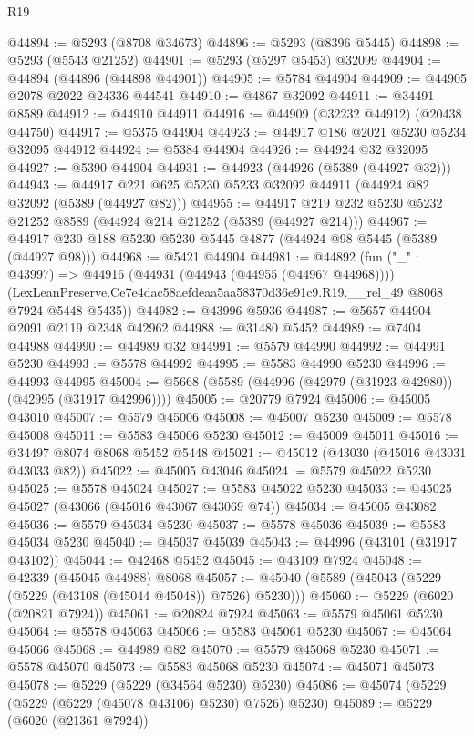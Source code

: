 \begin{lexlean}{R19}
\begin{coremodule}
@44894 := @5293 (@8708 @34673)
@44896 := @5293 (@8396 @5445)
@44898 := @5293 (@5543 @21252)
@44901 := @5293 (@5297 @5453) @32099
@44904 := @44894 (@44896 (@44898 @44901))
@44905 := @5784 @44904
@44909 := @44905 @2078 @2022 @24336 @44541
@44910 := @4867 @32092
@44911 := @34491 @8589
@44912 := @44910 @44911
@44916 := @44909 (@32232 @44912) (@20438 @44750)
@44917 := @5375 @44904
@44923 := @44917 @186 @2021 @5230 @5234 @32095 @44912
@44924 := @5384 @44904
@44926 := @44924 @32 @32095
@44927 := @5390 @44904
@44931 := @44923 (@44926 (@5389 (@44927 @32)))
@44943 := @44917 @221 @625 @5230 @5233 @32092 @44911 (@44924 @82 @32092 (@5389 (@44927 @82)))
@44955 := @44917 @219 @232 @5230 @5232 @21252 @8589 (@44924 @214 @21252 (@5389 (@44927 @214)))
@44967 := @44917 @230 @188 @5230 @5230 @5445 @4877 (@44924 @98 @5445 (@5389 (@44927 @98)))
@44968 := @5421 @44904
@44981 := @44892
    (fun ("_" : @43997) =>
    @44916
      (@44931 (@44943 (@44955 (@44967 @44968))))
      (LexLeanPreserve.Ce7e4dac58aefdeaa5aa58370d36e91c9.R19.__rel_49 @8068 @7924 @5448 @5435))
@44982 := @43996 @5936
@44987 := @5657 @44904 @2091 @2119 @2348 @42962
@44988 := @31480 @5452
@44989 := @7404 @44988
@44990 := @44989 @32
@44991 := @5579 @44990
@44992 := @44991 @5230
@44993 := @5578 @44992
@44995 := @5583 @44990 @5230
@44996 := @44993 @44995
@45004 := @5668 (@5589 (@44996 (@42979 (@31923 @42980)) (@42995 (@31917 @42996))))
@45005 := @20779 @7924
@45006 := @45005 @43010
@45007 := @5579 @45006
@45008 := @45007 @5230
@45009 := @5578 @45008
@45011 := @5583 @45006 @5230
@45012 := @45009 @45011
@45016 := @34497 @8074 @8068 @5452 @5448
@45021 := @45012 (@43030 (@45016 @43031 @43033 @82))
@45022 := @45005 @43046
@45024 := @5579 @45022 @5230
@45025 := @5578 @45024
@45027 := @5583 @45022 @5230
@45033 := @45025 @45027 (@43066 (@45016 @43067 @43069 @74))
@45034 := @45005 @43082
@45036 := @5579 @45034 @5230
@45037 := @5578 @45036
@45039 := @5583 @45034 @5230
@45040 := @45037 @45039
@45043 := @44996 (@43101 (@31917 @43102))
@45044 := @42468 @5452
@45045 := @43109 @7924
@45048 := @42339 (@45045 @44988) @8068
@45057 := @45040 (@5589 (@45043 (@5229 (@5229 (@43108 (@45044 @45048)) @7526) @5230)))
@45060 := @5229 (@6020 (@20821 @7924))
@45061 := @20824 @7924
@45063 := @5579 @45061 @5230
@45064 := @5578 @45063
@45066 := @5583 @45061 @5230
@45067 := @45064 @45066
@45068 := @44989 @82
@45070 := @5579 @45068 @5230
@45071 := @5578 @45070
@45073 := @5583 @45068 @5230
@45074 := @45071 @45073
@45078 := @5229 (@5229 (@34564 @5230) @5230)
@45086 := @45074 (@5229 (@5229 (@5229 (@45078 @43106) @5230) @7526) @5230)
@45089 := @5229 (@6020 (@21361 @7924))

\end{coremodule}
\end{lexlean}
